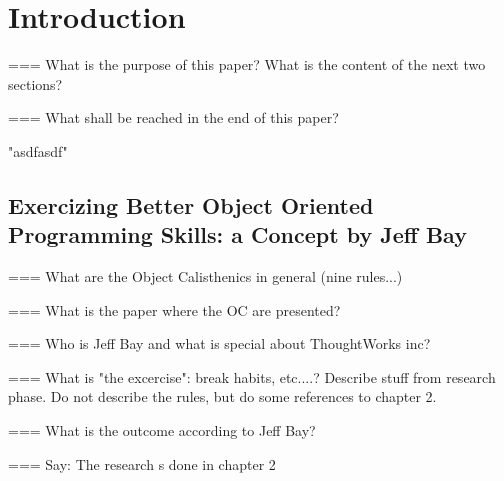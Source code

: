 \chapter{Introduction}
=== What is the purpose of this paper? What is the content of the next two sections?

=== What shall be reached in the end of this paper?

"asdfasdf" \cite{bay2008}

\section{Exercizing Better Object Oriented Programming Skills: a Concept by Jeff Bay}

=== What are the Object Calisthenics in general (nine rules...) 

=== What is the paper where the OC are presented?

=== Who is Jeff Bay and what is special about ThoughtWorks inc?

=== What is "the excercise": break habits, etc....? Describe stuff from research phase. Do not describe the rules, but do some references to chapter 2.

=== What is the outcome according to Jeff Bay?

=== Say: The research s done in chapter 2


